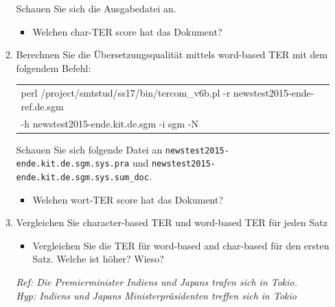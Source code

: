 \documentclass[12pt,fleqn]{article}
\begin{document}
\begin{enumerate}
\begin{enumerate}
\vspace{0.5cm} 
Schauen Sie sich die Ausgabedatei an. 

\vspace{0.5cm} 
\begin{itemize} 
\item Welchen char-TER score hat das Dokument? %
\end{itemize} 


\vspace{0.5cm} 
\item Berechnen Sie die Übersetzungsqualität mittels word-based TER mit dem folgendem Befehl:

\vspace{0.5cm} 
\begin{table}[h] 
 \begin{center} 
\begin{tabular}{l} 
perl /project/smtstud/ss17/bin/tercom\_v6b.pl -r newstest2015-ende-ref.de.sgm\\
-h newstest2015-ende.kit.de.sgm -i sgm -N \\ 
\end{tabular}
 \end{center}
\end{table}

\vspace{0.5cm}
Schauen Sie sich folgende Datei an \texttt{newstest2015-ende.kit.de.sgm.sys.pra} und \texttt{newstest2015-ende.kit.de.sgm.sys.sum\_doc}. 
\vspace{0.5cm} 
\begin{itemize} 
\item Welchen wort-TER score hat das Dokument? %
\end{itemize} 

\vspace{0.5cm} 
\item Vergleichen Sie character-based TER und word-based TER für jeden Satz

\vspace{0.5cm} 
\begin{itemize} 
 \item Vergleichen Sie die TER für word-based and char-based für den ersten Satz. Welche ist höher? Wieso? 
\end{itemize}

\vspace{0.5cm} 
\textit{Ref: Die Premierminister Indiens und Japans trafen sich in Tokio. } \\ 
\textit{Hyp: Indiens und Japans Ministerpräsidenten treffen sich in Tokio } \\ 



\end{enumerate}
\end{enumerate}
\end{document}
